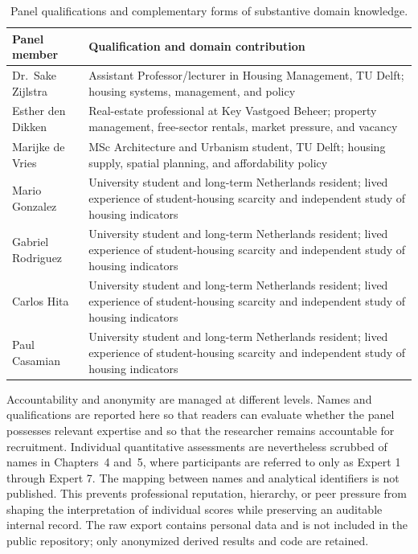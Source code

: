 \begin{table}[H]
    \centering
    \small
    \begin{tabularx}{\textwidth}{p{3.5cm}X}
        \toprule
        \textbf{Panel member} & \textbf{Qualification and domain contribution} \\
        \midrule
        Dr.~Sake Zijlstra & Assistant Professor/lecturer in Housing Management, TU Delft; housing systems, management, and policy \\
        Esther den Dikken & Real-estate professional at Key Vastgoed Beheer; property management, free-sector rentals, market pressure, and vacancy \\
        Marijke de Vries & MSc Architecture and Urbanism student, TU Delft; housing supply, spatial planning, and affordability policy \\
        Mario Gonzalez & University student and long-term Netherlands resident; lived experience of student-housing scarcity and independent study of housing indicators \\
        Gabriel Rodriguez & University student and long-term Netherlands resident; lived experience of student-housing scarcity and independent study of housing indicators \\
        Carlos Hita & University student and long-term Netherlands resident; lived experience of student-housing scarcity and independent study of housing indicators \\
        Paul Casamian & University student and long-term Netherlands resident; lived experience of student-housing scarcity and independent study of housing indicators \\
        \bottomrule
    \end{tabularx}
    \caption{Panel qualifications and complementary forms of substantive domain knowledge.}
    \label{tab:expert_profiles}
\end{table}

Accountability and anonymity are managed at different levels. Names and qualifications are reported here so that readers can evaluate whether the panel possesses relevant expertise and so that the researcher remains accountable for recruitment. Individual quantitative assessments are nevertheless scrubbed of names in Chapters~4 and~5, where participants are referred to only as Expert 1 through Expert 7. The mapping between names and analytical identifiers is not published. This prevents professional reputation, hierarchy, or peer pressure from shaping the interpretation of individual scores while preserving an auditable internal record. The raw export contains personal data and is not included in the public repository; only anonymized derived results and code are retained.

